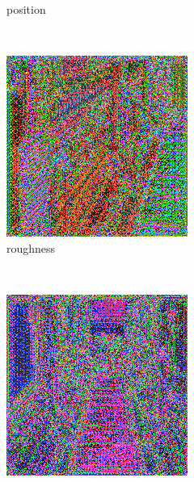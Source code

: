 \begin{figure}[h!]
\begin{subfigure}[b]{0.175\textwidth}
     \caption{position}
    \end{subfigure}
    ~
    \begin{subfigure}[b]{0.175\textwidth}
     \includegraphics[width=\textwidth]{figures/result/single/roughness/1.png}
     \caption{roughness}
    \end{subfigure}
    \\ \vspace{0.2cm} %
    \begin{subfigure}[b]{0.175\textwidth}
     \includegraphics[width=\textwidth]{figures/result/single/albedo/2.png}

\end{subfigure}
\end{figure}
